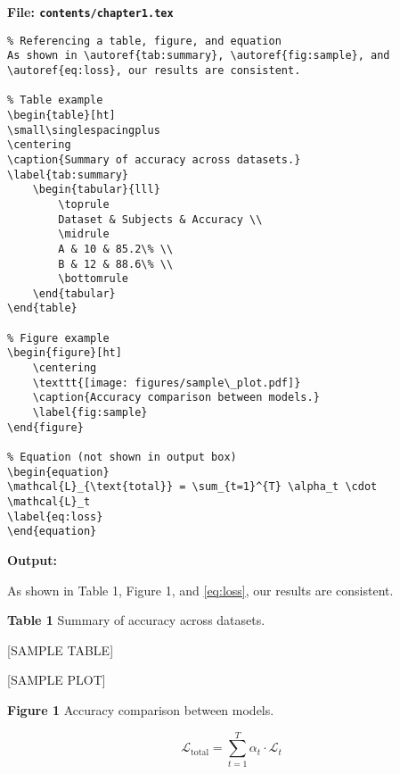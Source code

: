 \documentclass{VISTEC}
\begin{document}
\noindent\textbf{File: \texttt{contents/chapter1.tex}}\vspace{-1.5em}
\begin{verbatim}
% Referencing a table, figure, and equation
As shown in \autoref{tab:summary}, \autoref{fig:sample}, and \autoref{eq:loss}, our results are consistent.

% Table example
\begin{table}[ht]
\small\singlespacingplus
\centering
\caption{Summary of accuracy across datasets.}
\label{tab:summary}
    \begin{tabular}{lll}
        \toprule
        Dataset & Subjects & Accuracy \\
        \midrule
        A & 10 & 85.2\% \\
        B & 12 & 88.6\% \\
        \bottomrule
    \end{tabular}
\end{table}

% Figure example
\begin{figure}[ht]
    \centering
    \texttt{[image: figures/sample\_plot.pdf]}
    \caption{Accuracy comparison between models.}
    \label{fig:sample}
\end{figure}

% Equation (not shown in output box)
\begin{equation}
\mathcal{L}_{\text{total}} = \sum_{t=1}^{T} \alpha_t \cdot \mathcal{L}_t
\label{eq:loss}
\end{equation}
\end{verbatim}

\textbf{Output:}\vspace{0.5em}

\begin{tcolorbox}[colback=white, colframe=black, sharp corners, boxrule=0.4pt]
\hspace{1.25cm}As shown in Table 1, Figure 1, and \autoref{eq:loss}, our results are consistent.

\vspace{6pt}
\textbf{Table 1} Summary of accuracy across datasets.

\vspace{-6pt}
\begin{center}
[SAMPLE TABLE]
\end{center}

\begin{center}
[SAMPLE PLOT]
\end{center}
\vspace{-6pt}
\textbf{Figure 1} Accuracy comparison between models.

\begin{equation}
\mathcal{L}_{\text{total}} = \sum_{t=1}^{T} \alpha_t \cdot \mathcal{L}_t
\label{eq:loss}
\end{equation}

\end{tcolorbox}
\end{document}
